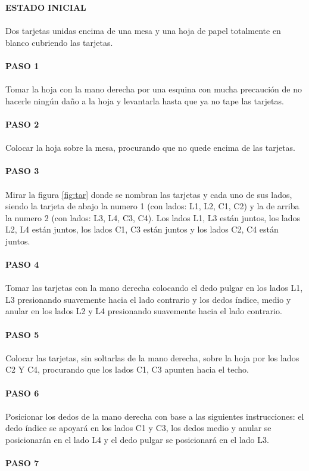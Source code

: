 \documentclass{article}
\begin{document}
\textbf{ESTADO INICIAL} \\\\
Dos tarjetas unidas encima de una mesa y una hoja de papel totalmente en blanco cubriendo las tarjetas. \\\\
\textbf{PASO 1} \\\\
Tomar la hoja con la mano derecha por una esquina con mucha precaución de no hacerle ningún daño a la hoja y levantarla hasta que ya no tape las tarjetas. \\\\
\textbf{PASO 2} \\\\
Colocar la hoja sobre la mesa, procurando que no quede encima de las tarjetas. \\\\
\textbf{PASO 3} \\\\
Mirar la figura \ref{fig:tar} donde se nombran las tarjetas y cada uno de sus lados, siendo la tarjeta de abajo la numero 1 (con lados: L1, L2, C1, C2) y la de arriba la numero 2 (con lados: L3, L4, C3, C4). Los lados L1, L3 están juntos, los lados L2, L4 están juntos, los lados C1, C3 están juntos y los lados C2, C4 están juntos. \\\\
\textbf{PASO 4} \\\\
Tomar las tarjetas con la mano derecha colocando el dedo pulgar en los lados L1, L3 presionando suavemente hacia el lado contrario y los dedos índice, medio y anular en los lados L2 y L4 presionando suavemente hacia el lado contrario. \\\\
\textbf{PASO 5} \\\\
Colocar las tarjetas, sin soltarlas de la mano derecha, sobre la hoja por los lados C2 Y C4, procurando que los lados C1, C3 apunten hacia el techo. \\\\
\textbf{PASO 6} \\\\
Posicionar los dedos de la mano derecha con base a las siguientes instrucciones: el dedo índice se apoyará en los lados C1 y C3, los dedos medio y anular se posicionarán en el lado L4 y el dedo pulgar se posicionará en el lado L3. \\\\
\textbf{PASO 7} \\\\
\end{document}
